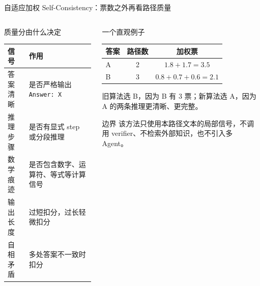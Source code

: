 \documentclass[10pt,aspectratio=169]{beamer}
\begin{document}
\begin{frame}{自适应加权 Self-Consistency：票数之外再看路径质量}
  \begin{columns}[T,onlytextwidth]
    \begin{column}{0.54\textwidth}
      \begin{block}{质量分由什么决定}
        \begin{tabularx}{\linewidth}{lY}
          \toprule
          信号 & 作用 \\
          \midrule
          答案清晰 & 是否严格输出 \texttt{Answer: X} \\
          推理步骤 & 是否有显式 step 或分段推理 \\
          数学痕迹 & 是否包含数字、运算符、等式等计算信号 \\
          输出长度 & 过短扣分，过长轻微扣分 \\
          自相矛盾 & 多处答案不一致时扣分 \\
          \bottomrule
        \end{tabularx}
      \end{block}
    \end{column}
    \begin{column}{0.42\textwidth}
      \begin{block}{一个直观例子}
        \small
        \begin{tabular}{lcc}
          \toprule
          答案 & 路径数 & 加权票 \\
          \midrule
          A & 2 & $1.8 + 1.7 = 3.5$ \\
          B & 3 & $0.8 + 0.7 + 0.6 = 2.1$ \\
          \bottomrule
        \end{tabular}
        \smallskip

        旧算法选 B，因为 B 有 3 票；新算法选 A，因为 A 的两条推理更清晰、更完整。
      \end{block}
      \begin{alertblock}{边界}
        该方法只使用本路径文本的局部信号，不调用 verifier、不检索外部知识，也不引入多 Agent。
      \end{alertblock}
    \end{column}
  \end{columns}
\end{frame}
\end{document}
